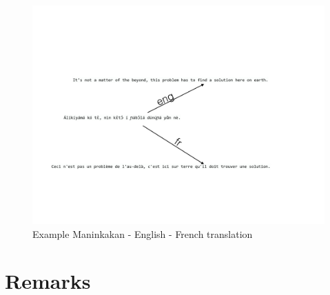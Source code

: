 	\begin{figure}[ht]
		\small
		\centering
		\includegraphics[trim=4cm 2cm 2cm 3cm, clip=true, height=0.6\textheight]{files/Figures/manin.jpg}
		\caption{Example Maninkakan - English - French translation}
		\label{fig:manin_example}
	\end{figure}
	



\section{Remarks}
\label{sec:baseline_remarks}



